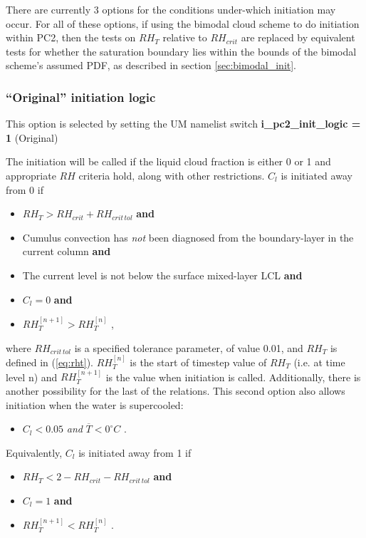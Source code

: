 \documentclass{UMDP_article}
\begin{document}
There are currently 3 options for the conditions under-which initiation
may occur.  For all of these options,
if using the bimodal cloud scheme to do initiation within PC2,
then the tests on $RH_T$ relative to $RH_{crit}$ are replaced by equivalent
tests for whether the saturation boundary lies within the bounds
of the bimodal scheme's assumed PDF, as described in section
\ref{sec:bimodal_init}.

\subsubsection{``Original'' initiation logic}

This option is selected by setting the UM namelist switch
{\bf i\_pc2\_init\_logic = 1} (Original)

The initiation will be called if the liquid cloud fraction is either
0 or 1 and appropriate $RH$ criteria hold, along with other restrictions.
$C_l$ is initiated away from 0 if

\begin{itemize}
\item{ $RH_T > RH_{crit} + RH_{crit \, tol}$ \textbf{and} }
\item{ Cumulus convection has {\em not} been diagnosed from the
       boundary-layer in the current column \textbf{and} }
\item{ The current level is not below the surface mixed-layer LCL \textbf{and} }
\item{ $C_l = 0$ \textbf{and} }
\item{ $RH_T^{[n+1]} > RH_T^{[n]}$ ,}
\end{itemize}

where $RH_{crit \, tol}$ is a specified tolerance parameter, of value 0.01,
and $RH_T$ is defined in (\ref{eq:rht}). $RH_T^{[n]}$ is the start of
timestep value of $RH_T$ (i.e. at time level n) and $RH_T^{[n+1]}$ is the
value when initiation is called.
Additionally, there is another possibility for the last of the relations.
This second option also allows initiation when the water
is supercooled:

\begin{itemize}
\item{ $C_l < 0.05$ \textit{and} $\overline{T} < 0 ^{\circ} C$ .}
\end{itemize}

Equivalently, $C_l$ is initiated away from 1 if

\begin{itemize}
\item{ $RH_T < 2 - RH_{crit} - RH_{crit \, tol}$ \textbf{and} }
\item{ $C_l = 1$ \textbf{and}}
\item{ $RH_T^{[n+1]} < RH_T^{[n]}$ .}
\end{itemize}
\end{document}
